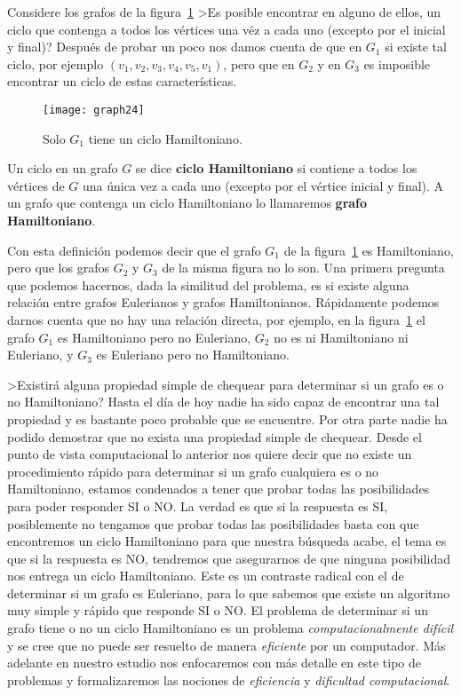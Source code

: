 Considere los grafos de la figura~\ref{fig:graph24}
>Es posible encontrar en alguno de ellos, un ciclo que contenga a todos los vértices una véz a cada uno (excepto por el inicial y final)?
Después de probar un poco nos damos cuenta de que en $G_1$ si existe tal ciclo, por ejemplo $(v_1,v_2,v_3,v_4,v_5,v_1)$, pero que en $G_2$ y en $G_3$ es imposible encontrar un ciclo de estas características.
\begin{figure}[h!]
\centering
\texttt{[image: graph24]}
\caption{Solo $G_1$ tiene un ciclo Hamiltoniano.}
\label{fig:graph24}
\end{figure}

\begin{definicion}
Un ciclo en un grafo $G$ se dice {\bf ciclo Hamiltoniano} si contiene a todos los vértices de $G$ una única vez a cada uno (excepto por el vértice inicial y final).
A un grafo que contenga un ciclo Hamiltoniano lo llamaremos {\bf grafo Hamiltoniano}.
\end{definicion}

Con esta definición podemos decir que el grafo $G_1$ de la figura~\ref{fig:graph24} es Hamiltoniano, pero que los grafos $G_2$ y $G_3$ de la misma figura no lo son.
Una primera pregunta que podemos hacernos, dada la similitud del problema, es si existe alguna relación entre grafos Eulerianos y grafos Hamiltonianos.
Rápidamente podemos darnos cuenta que no hay una relación directa, por ejemplo, en la figura~\ref{fig:graph24} el grafo $G_1$ es Hamiltoniano pero no Euleriano, $G_2$ no es ni Hamiltoniano ni Euleriano, y $G_3$ es Euleriano pero no Hamiltoniano.

>Existirá alguna propiedad simple de chequear para determinar si un grafo es o no Hamiltoniano?
Hasta el día de hoy nadie ha sido capaz de encontrar una tal propiedad y es bastante poco probable que se encuentre.
Por otra parte nadie ha podido demostrar que no exista una propiedad simple de chequear.
Desde el punto de vista computacional lo anterior nos quiere decir que no existe un procedimiento rápido para determinar si un grafo cualquiera es o no Hamiltoniano, estamos condenados a tener que probar todas las posibilidades para poder responder SI o NO.
La verdad es que si la respuesta es SI, posiblemente no tengamos que probar todas las posibilidades basta con que encontremos un ciclo Hamiltoniano para que nuestra búsqueda acabe, el tema es que si la respuesta es NO, tendremos que asegurarnos de que ninguna posibilidad nos entrega un ciclo Hamiltoniano.
Este es un contraste radical con el de determinar si un grafo es Euleriano, para lo que sabemos que existe un algoritmo muy simple y rápido que responde SI o NO.
El problema de determinar si un grafo tiene o no un ciclo Hamiltoniano es un problema \emph{computacionalmente difícil} y se cree que no puede ser resuelto de manera \emph{eficiente} por un computador.
Más adelante en nuestro estudio nos enfocaremos con más detalle en este tipo de problemas y formalizaremos las nociones de \emph{eficiencia} y \emph{dificultad computacional}.

